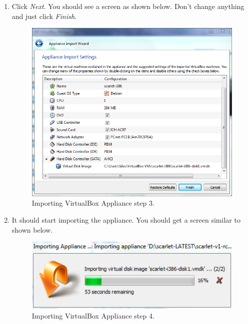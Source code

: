 \documentclass[pdftex,11pt,letterpaper]{article}
\begin{document}
\begin{enumerate}
\item Click \textit{Next}. You should see a screen as shown below.  Don't change anything and just click \textit{Finish}.

    \begin{figure}[H]
        \begin{center}
        \leavevmode
            \includegraphics[]{scarlet_images/import_wizard_3.png}
        \end{center}
        \caption{Importing VirtualBox Appliance step 3.}
        \label{fig:import_wizard_3}
    \end{figure}
    
\item It should start importing the appliance.  You should get a screen similar to shown below.

    \begin{figure}[H]
        \begin{center}
        \leavevmode
            \includegraphics[]{scarlet_images/import_wizard_4.png}
        \end{center}
        \caption{Importing VirtualBox Appliance step 4.}
        \label{fig:import_wizard_4}
    \end{figure}
    

\end{enumerate}
\end{document}
